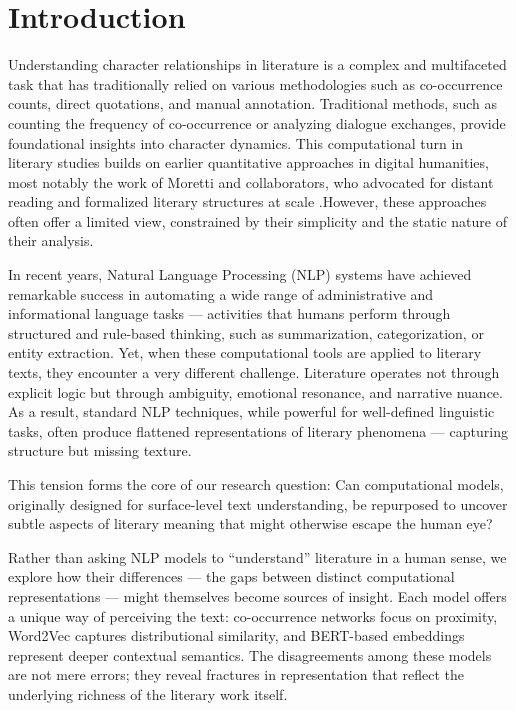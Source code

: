 \documentclass[a4paper,12pt]{report}
\begin{document}
\chapter{Introduction}
\label{sec:intro}
Understanding character relationships in literature is a complex and multifaceted task that has traditionally relied on various methodologies such as co-occurrence counts, direct quotations, and manual annotation. Traditional methods, such as counting the frequency of co-occurrence or analyzing dialogue exchanges, provide foundational insights into character dynamics. This computational turn in literary studies builds on earlier quantitative approaches in digital humanities, most notably the work of Moretti and collaborators, who advocated for distant reading and formalized literary structures at scale \cite{MORETTI2011Quantitative}.However, these approaches often offer a limited view, constrained by their simplicity and the static nature of their analysis.

In recent years, Natural Language Processing (NLP) systems have achieved remarkable success in automating a wide range of administrative and informational language tasks — activities that humans perform through structured and rule-based thinking, such as summarization, categorization, or entity extraction. Yet, when these computational tools are applied to literary texts, they encounter a very different challenge. Literature operates not through explicit logic but through ambiguity, emotional resonance, and narrative nuance. As a result, standard NLP techniques, while powerful for well-defined linguistic tasks, often produce flattened representations of literary phenomena — capturing structure but missing texture.

This tension forms the core of our research question:
Can computational models, originally designed for surface-level text understanding, be repurposed to uncover subtle aspects of literary meaning that might otherwise escape the human eye?

Rather than asking NLP models to “understand” literature in a human sense, we explore how their differences — the gaps between distinct computational representations — might themselves become sources of insight. Each model offers a unique way of perceiving the text: co-occurrence networks focus on proximity, Word2Vec captures distributional similarity, and BERT-based embeddings represent deeper contextual semantics. The disagreements among these models are not mere errors; they reveal fractures in representation that reflect the underlying richness of the literary work itself.
\end{document}
